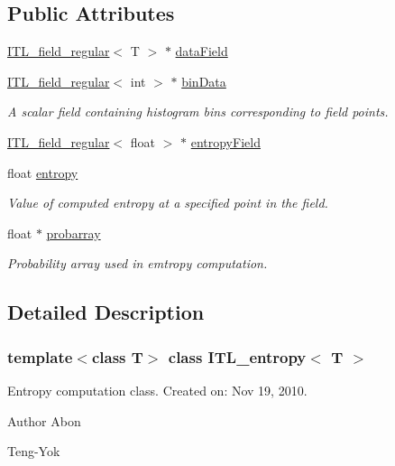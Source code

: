 \subsection*{Public Attributes}
\begin{DoxyCompactItemize}
\item 
\hyperlink{classITL__field__regular}{ITL\_\-field\_\-regular}$<$ T $>$ $\ast$ \hyperlink{classITL__entropy_aa37a62d817f8cd335b63d4d9a9239e10}{dataField}
\item 
\hyperlink{classITL__field__regular}{ITL\_\-field\_\-regular}$<$ int $>$ $\ast$ \hyperlink{classITL__entropy_ae719783c7a6ae4481b711a1caf9e3ded}{binData}
\begin{DoxyCompactList}\small\item\em A scalar field containing histogram bins corresponding to field points. \item\end{DoxyCompactList}\item 
\hyperlink{classITL__field__regular}{ITL\_\-field\_\-regular}$<$ float $>$ $\ast$ \hyperlink{classITL__entropy_ac9940978878a0f624d94ada66fc1bfd5}{entropyField}
\item 
float \hyperlink{classITL__entropy_afea389e705dfeb2a6924a84e9055777d}{entropy}
\begin{DoxyCompactList}\small\item\em Value of computed entropy at a specified point in the field. \item\end{DoxyCompactList}\item 
float $\ast$ \hyperlink{classITL__entropy_abd080665e882ac3a2e56fd23ec104114}{probarray}
\begin{DoxyCompactList}\small\item\em Probability array used in emtropy computation. \item\end{DoxyCompactList}\end{DoxyCompactItemize}


\subsection{Detailed Description}
\subsubsection*{template$<$class T$>$ class ITL\_\-entropy$<$ T $>$}

Entropy computation class. Created on: Nov 19, 2010. \begin{DoxyAuthor}{Author}
Abon 

Teng-\/Yok 
\end{DoxyAuthor}


